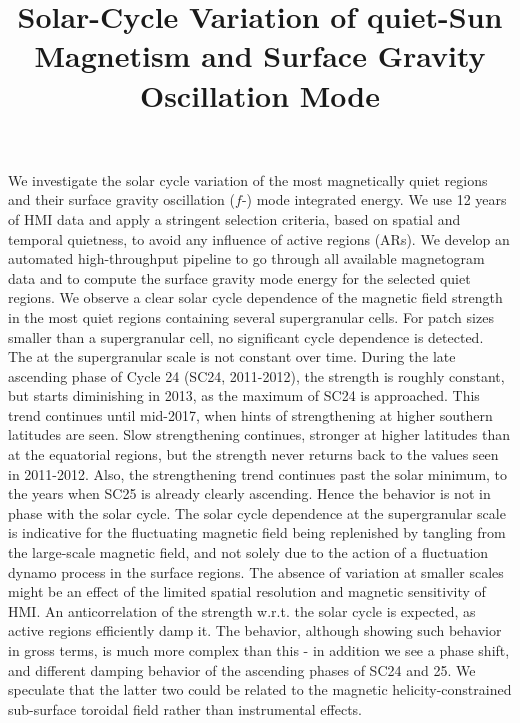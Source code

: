 \documentclass{aa}
\begin{document}
\title{Solar-Cycle Variation of quiet-Sun Magnetism and Surface Gravity Oscillation Mode}




{We investigate the solar cycle variation of the most magnetically quiet regions and
their surface gravity oscillation ($f$-) mode integrated 
energy.
}
{We use 12 years of HMI data and apply a stringent selection criteria, based on
spatial and temporal quietness, to avoid any influence of active regions (ARs).
We develop an automated high-throughput pipeline to go through all available magnetogram data
and to compute the surface gravity mode 
energy
for the selected quiet regions.}
{We observe a clear solar cycle dependence of the magnetic field strength in the most
quiet regions containing several supergranular cells. For patch sizes smaller than a supergranular
cell, no significant cycle dependence is detected. The \fff at the supergranular scale 
is not constant over time.
During the late ascending phase of Cycle 24 (SC24, 2011-2012), the \fff strength is roughly constant, but starts diminishing in 2013, as the maximum of SC24 is approached. This trend continues
until 
mid-2017,
when
hints of strengthening at higher southern latitudes
are seen.
Slow strengthening continues, stronger at higher latitudes than at the equatorial regions, but the \fff strength never returns back to the values seen in 2011-2012. Also, the strengthening trend continues past the solar minimum, to the years when SC25 is already clearly ascending. Hence the \fff behavior is not in phase with the solar cycle. 
}
{The solar cycle dependence at the supergranular scale is indicative for the fluctuating magnetic
field being replenished by tangling from the large-scale magnetic field, and not solely due to
the action of a fluctuation dynamo process in the surface regions. 
The absence of variation at smaller scales might be an effect of the
limited spatial resolution and magnetic sensitivity of HMI.
An anticorrelation of the \fff strength w.r.t. the solar cycle is expected, as active regions efficiently damp it. The \fff behavior, although showing such behavior in gross terms, is much more complex than this - in addition we see a phase shift, and different damping behavior of the ascending phases of SC24 and 25. We speculate that the latter two could be related to the magnetic helicity-constrained sub-surface toroidal field rather than instrumental effects. 
}
\end{document}
